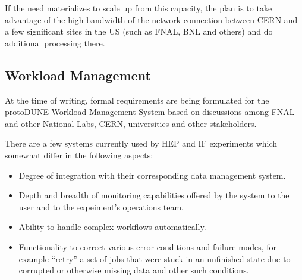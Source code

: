If the need materializes to scale up from this capacity, 
the plan is to take advantage of the high bandwidth of the network connection between
CERN and a few significant sites in the US (such as FNAL, BNL and others) and do additional processing there.



\subsection{Workload Management}
\label{sec:dune-wms}

At the time of writing, formal requirements are being formulated for the protoDUNE Workload Management System based on
discussions among FNAL and other National Labs, CERN, universities and other stakeholders. 

There are a few systems currently used by HEP and IF experiments which somewhat differ in the following aspects:
\begin{itemize}

\item Degree of integration with their corresponding data management system.

\item Depth and breadth of monitoring capabilities offered by the system to the user and to the expeiment's operations team.

\item Ability to handle complex workflows automatically.

\item Functionality to correct various error conditions and failure modes, for example ``retry'' a set of jobs that were stuck in an unfinished state
due to corrupted or otherwise missing data and other such conditions.

\end{itemize}

